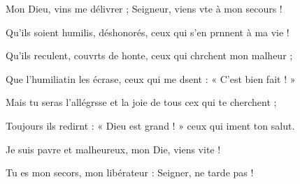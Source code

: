 \item Mon Dieu, vins me délivrer ; Seigneur, viens vte à mon secours !
\item Qu’ils soient humilis, déshonorés, ceux qui s’en prnnent à ma vie ! 
\item Qu’ils reculent, couvrts de honte, ceux qui chrchent mon malheur ;
\item Que l’humiliatin les écrase, ceux qui me dsent : « C’est bien fait ! »
\item Mais tu seras l’allégrsse et la joie de tous cex qui te cherchent ;
\item Toujours ils redirnt : « Dieu est grand ! » ceux qui iment ton salut.
\item Je suis pavre et malheureux, mon Die, viens vite !
\item Tu es mon secors, mon libérateur : Seigner, ne tarde pas !